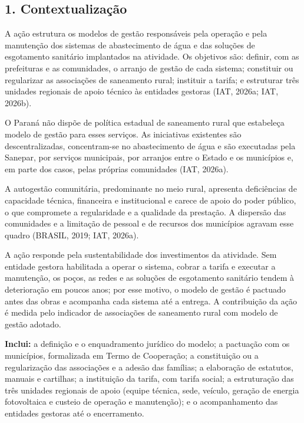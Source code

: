 
{}
\subsection*{1. Contextualização}

A ação estrutura os modelos de gestão responsáveis pela operação e pela manutenção dos sistemas de abastecimento de água e das soluções de esgotamento sanitário implantados na atividade. Os objetivos são: definir, com as prefeituras e as comunidades, o arranjo de gestão de cada sistema; constituir ou regularizar as associações de saneamento rural; instituir a tarifa; e estruturar três unidades regionais de apoio técnico às entidades gestoras (IAT, 2026a; IAT, 2026b).

O Paraná não dispõe de política estadual de saneamento rural que estabeleça modelo de gestão para esses serviços. As iniciativas existentes são descentralizadas, concentram-se no abastecimento de água e são executadas pela Sanepar, por serviços municipais, por arranjos entre o Estado e os municípios e, em parte dos casos, pelas próprias comunidades (IAT, 2026a).

A autogestão comunitária, predominante no meio rural, apresenta deficiências de capacidade técnica, financeira e institucional e carece de apoio do poder público, o que compromete a regularidade e a qualidade da prestação. A dispersão das comunidades e a limitação de pessoal e de recursos dos municípios agravam esse quadro (BRASIL, 2019; IAT, 2026a).

A ação responde pela sustentabilidade dos investimentos da atividade. Sem entidade gestora habilitada a operar o sistema, cobrar a tarifa e executar a manutenção, os poços, as redes e as soluções de esgotamento sanitário tendem à deterioração em poucos anos; por esse motivo, o modelo de gestão é pactuado antes das obras e acompanha cada sistema até a entrega. A contribuição da ação é medida pelo indicador de associações de saneamento rural com modelo de gestão adotado.

\textbf{Inclui:} a definição e o enquadramento jurídico do modelo; a pactuação com os municípios, formalizada em Termo de Cooperação; a constituição ou a regularização das associações e a adesão das famílias; a elaboração de estatutos, manuais e cartilhas; a instituição da tarifa, com tarifa social; a estruturação das três unidades regionais de apoio (equipe técnica, sede, veículo, geração de energia fotovoltaica e custeio de operação e manutenção); e o acompanhamento das entidades gestoras até o encerramento.


